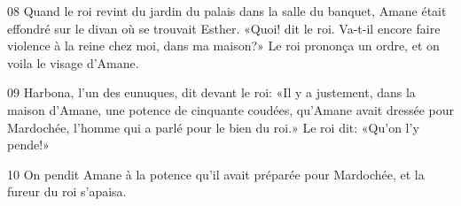 
08 Quand le roi revint du jardin du palais dans la salle du banquet, Amane était effondré sur le divan où se trouvait Esther. «Quoi! dit le roi. Va-t-il encore faire violence à la reine chez moi, dans ma maison?» Le roi prononça un ordre, et on voila le visage d’Amane.

09 Harbona, l’un des eunuques, dit devant le roi: «Il y a justement, dans la maison d’Amane, une potence de cinquante coudées, qu’Amane avait dressée pour Mardochée, l’homme qui a parlé pour le bien du roi.» Le roi dit: «Qu’on l’y pende!»

10 On pendit Amane à la potence qu’il avait préparée pour Mardochée, et la fureur du roi s’apaisa.